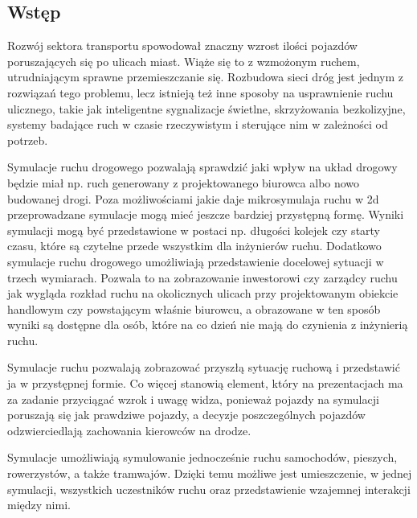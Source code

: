 \documentclass{sprawozdanie-agh}
\begin{document}

	\stronatytulowa{}

	\begin{multicols}{2}

		\section{Wstęp}

		Rozwój sektora transportu spowodował znaczny wzrost ilości pojazdów poruszających się po ulicach miast. Wiąże się to z wzmożonym ruchem, utrudniającym sprawne przemieszczanie się. Rozbudowa sieci dróg jest jednym z rozwiązań tego problemu, lecz istnieją też inne sposoby na usprawnienie ruchu ulicznego, takie jak inteligentne sygnalizacje świetlne, skrzyżowania bezkolizyjne, systemy badające ruch w czasie rzeczywistym i sterujące nim w zależności od potrzeb.

		Symulacje ruchu drogowego pozwalają sprawdzić jaki wpływ na układ drogowy będzie miał np. ruch generowany z projektowanego biurowca albo nowo budowanej drogi. Poza możliwościami jakie daje mikrosymulaja ruchu w 2d przeprowadzane symulacje mogą mieć  jeszcze bardziej przystępną formę. Wyniki symulacji mogą być przedstawione w postaci np. długości kolejek czy starty czasu, które są czytelne przede wszystkim dla inżynierów ruchu. Dodatkowo symulacje ruchu drogowego umożliwiają przedstawienie docelowej sytuacji w trzech wymiarach. Pozwala to na zobrazowanie inwestorowi czy zarządcy ruchu jak wygląda rozkład ruchu na okolicznych ulicach przy projektowanym obiekcie handlowym czy powstającym właśnie biurowcu, a obrazowane w ten sposób wyniki są dostępne dla osób, które na co dzień nie mają do czynienia z inżynierią ruchu.

		Symulacje ruchu pozwalają zobrazować przyszłą sytuację ruchową i przedstawić ja w przystępnej formie. Co więcej stanowią element, który na prezentacjach ma za zadanie przyciągać wzrok i uwagę widza, ponieważ pojazdy na symulacji poruszają się jak prawdziwe pojazdy, a decyzje poszczególnych pojazdów odzwierciedlają zachowania kierowców na drodze.

		Symulacje umożliwiają symulowanie jednocześnie ruchu samochodów, pieszych, rowerzystów, a także tramwajów. Dzięki temu możliwe jest umieszczenie, w jednej symulacji, wszystkich uczestników ruchu oraz przedstawienie wzajemnej interakcji między nimi.


\end{multicols}
\end{document}
